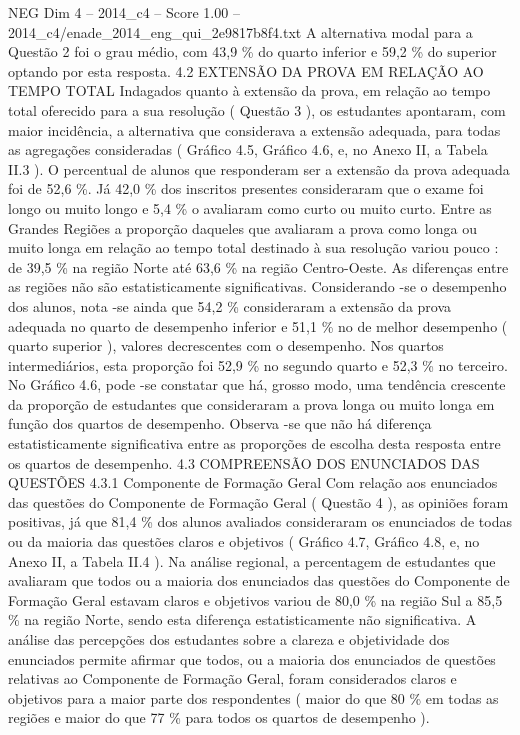 \begin{textsample}{NEG Dim 4 – 2014\_c4 – Score 1.00 – 2014\_c4/enade\_2014\_eng\_qui\_2e9817b8f4.txt}
A alternativa modal para a Questão 2 foi o grau médio, com 43,9 \% do quarto inferior e 59,2 \% do superior optando por esta resposta. 4.2 EXTENSÃO DA PROVA EM RELAÇÃO AO TEMPO TOTAL Indagados quanto à extensão da prova, em relação ao tempo total oferecido para a sua resolução ( Questão 3 ), os estudantes apontaram, com maior incidência, a alternativa que considerava a extensão adequada, para todas as agregações consideradas ( Gráfico 4.5, Gráfico 4.6, e, no Anexo II, a Tabela II.3 ).
O percentual de alunos que responderam ser a extensão da prova adequada foi de 52,6 \%.
Já 42,0 \% dos inscritos presentes consideraram que o exame foi longo ou muito longo e 5,4 \% o avaliaram como curto ou muito curto.
Entre as Grandes Regiões a proporção daqueles que avaliaram a prova como longa ou muito longa em relação ao tempo total destinado à sua resolução variou pouco : de 39,5 \% na região Norte até 63,6 \% na região Centro-Oeste.
As diferenças entre as regiões não são estatisticamente significativas.
Considerando -se o desempenho dos alunos, nota -se ainda que 54,2 \% consideraram a extensão da prova adequada no quarto de desempenho inferior e 51,1 \% no de melhor desempenho ( quarto superior ), valores decrescentes com o desempenho.
Nos quartos intermediários, esta proporção foi 52,9 \% no segundo quarto e 52,3 \% no terceiro.
No Gráfico 4.6, pode -se constatar que há, grosso modo, uma tendência crescente da proporção de estudantes que consideraram a prova longa ou muito longa em função dos quartos de desempenho.
Observa -se que não há diferença estatisticamente significativa entre as proporções de escolha desta resposta entre os quartos de desempenho. 4.3 COMPREENSÃO DOS ENUNCIADOS DAS QUESTÕES 4.3.1 Componente de Formação Geral Com relação aos enunciados das questões do Componente de Formação Geral ( Questão 4 ), as opiniões foram positivas, já que 81,4 \% dos alunos avaliados consideraram os enunciados de todas ou da maioria das questões claros e objetivos ( Gráfico 4.7, Gráfico 4.8, e, no Anexo II, a Tabela II.4 ).
Na análise regional, a percentagem de estudantes que avaliaram que todos ou a maioria dos enunciados das questões do Componente de Formação Geral estavam claros e objetivos variou de 80,0 \% na região Sul a 85,5 \% na região Norte, sendo esta diferença estatisticamente não significativa.
A análise das percepções dos estudantes sobre a clareza e objetividade dos enunciados permite afirmar que todos, ou a maioria dos enunciados de questões relativas ao Componente de Formação Geral, foram considerados claros e objetivos para a maior parte dos respondentes ( maior do que 80 \% em todas as regiões e maior do que 77 \% para todos os quartos de desempenho ).

\end{textsample}
